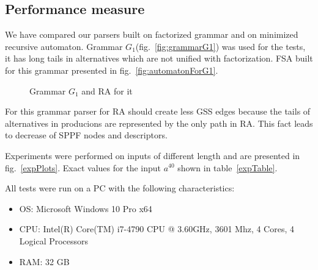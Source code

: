 \documentclass[runningheads,a4paper]{llncs}
\begin{document}
\subsection{Performance measure}

We have compared our parsers built on factorized grammar and on minimized recursive automaton.
Grammar $G_1$(fig.~\ref{fig:grammarG1}) was used for the tests,
it has long tails in alternatives which are not unified with factorization.
FSA built for this grammar presented in fig.~\ref{fig:automatonForG1}.

\begin{figure}[H]
    \centering

    \caption{Grammar $G_1$ and RA for it}
\end{figure}

For this grammar parser for RA should create less GSS edges because the tails of alternatives in producions
are represented by the only path in RA. This fact leads to decrease of SPPF nodes and descriptors.

Experiments were performed on inputs of different length and are presented in fig.~\ref{expPlots}.
Exact values for the input $a^{40}$ shown in table~\ref{expTable}.

All tests were run on a PC with the following characteristics:
\begin{itemize}
    \item OS: Microsoft Windows 10 Pro x64
    \item CPU: Intel(R) Core(TM) i7-4790 CPU @ 3.60GHz, 3601 Mhz, 4 Cores, 4 Logical Processors
    \item RAM: 32 GB
\end{itemize}
\end{document}
